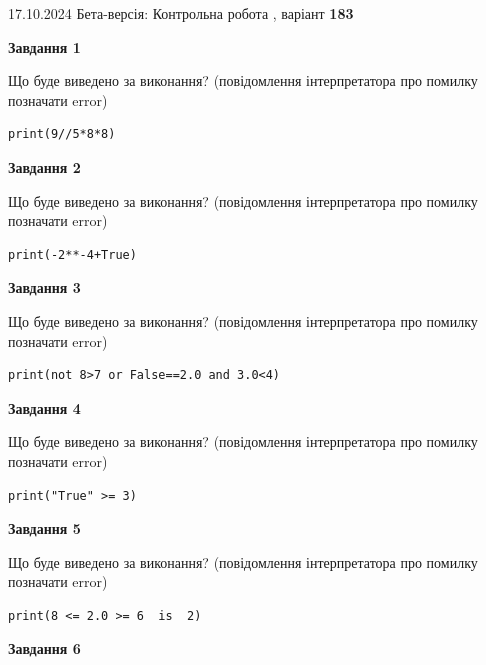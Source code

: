 \documentclass[12pt, ukrainian]{article}
\begin{document}
{\Large{17.10.2024 Бета-версія: Контрольна робота , варіант  \No \textbf { 183 }\par}}
{
\begin {large}
{\begin {center}\textbf{Завдання 1}\end {center}}

Що буде виведено за виконання? (повідомлення інтерпретатора про помилку позначати error)\par
\begin{verbatim}
print(9//5*8*8)
\end{verbatim}

{\begin {center}\textbf{Завдання 2}\end {center}}

Що буде виведено за виконання? (повідомлення інтерпретатора про помилку позначати error)\par
\begin{verbatim}
print(-2**-4+True)
\end{verbatim}

{\begin {center}\textbf{Завдання 3}\end {center}}

Що буде виведено за виконання? (повідомлення інтерпретатора про помилку позначати error)\par
\begin{verbatim}
print(not 8>7 or False==2.0 and 3.0<4)
\end{verbatim}

{\begin {center}\textbf{Завдання 4}\end {center}}

Що буде виведено за виконання? (повідомлення інтерпретатора про помилку позначати error)\par
\begin{verbatim}
print("True" >= 3)
\end{verbatim}

{\begin {center}\textbf{Завдання 5}\end {center}}

Що буде виведено за виконання? (повідомлення інтерпретатора про помилку позначати error)\par
\begin{verbatim}
print(8 <= 2.0 >= 6  is  2)
\end{verbatim}

{\begin {center}\textbf{Завдання 6}\end {center}}


\end{large}}
\end{document}

